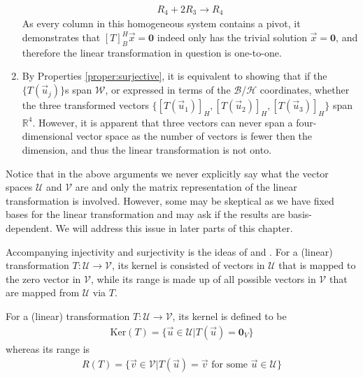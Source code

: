 \begin{solution}
\begin{enumerate}[label=(\alph*)]
\begin{align*}
    R_4 + 2R_3 \to R_4
    \end{align*}
    As every column in this homogeneous system contains a pivot, it demonstrates that $[T]_B^H\vec{x} = \textbf{0}$ indeed only has the trivial solution $\vec{x} = \textbf{0}$, and therefore the linear transformation in question is one-to-one.
    \item By Properties \ref{proper:surjective}, it is equivalent to showing that if the $\{T(\vec{u}_j)\}$s span $\mathcal{W}$, or expressed in terms of the $\mathcal{B}$/$\mathcal{H}$ coordinates, whether the three transformed vectors $\{[T(\vec{u}_1)]_H, [T(\vec{u}_2)]_H, [T(\vec{u}_3)]_H\}$ span $\mathbb{R}^4$. However, it is apparent that three vectors can never span a four-dimensional vector space as the number of vectors is fewer then the dimension, and thus the linear transformation is not onto.
\end{enumerate}
Notice that in the above arguments we never explicitly say what the vector spaces $\mathcal{U}$ and $\mathcal{V}$ are and only the matrix representation of the linear transformation is involved. However, some may be skeptical as we have fixed bases for the linear transformation and may ask if the results are basis-dependent. We will address this issue in later parts of this chapter.
\end{solution}
Accompanying injectivity and surjectivity is the ideas of  and . For a (linear) transformation $T: \mathcal{U} \to \mathcal{V}$, its kernel is consisted of vectors in $\mathcal{U}$ that is mapped to the zero vector in $\mathcal{V}$, while its range is made up of all possible vectors in $\mathcal{V}$ that are mapped from $\mathcal{U}$ via $T$.
\begin{defn}
\label{defn:kernelrange}
For a (linear) transformation $T: \mathcal{U} \to \mathcal{V}$, its kernel is defined to be
\begin{align*}
\text{Ker}(T) = \{\vec{u} \in \mathcal{U} | T(\vec{u}) = \textbf{0}_V\}
\end{align*}
whereas its range is
\begin{align*}
R(T) = \{\vec{v} \in \mathcal{V} | T(\vec{u}) = \vec{v} \text{ for some } \vec{u} \in \mathcal{U}\}    
\end{align*}
\end{defn}
